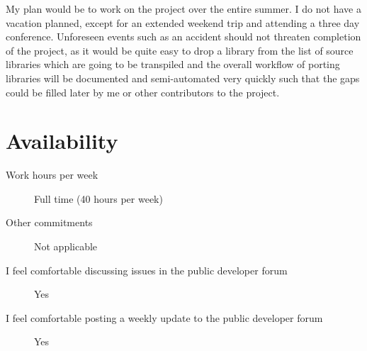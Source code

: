 \documentclass{scrartcl}
\begin{document}
My plan would be to work on the project over the entire summer. I do not have a vacation planned, except for an extended weekend trip and attending a three day conference. Unforeseen events such as an accident should not threaten completion of the project, as it would be quite easy to drop a library from the list of source libraries which are going to be transpiled and the overall workflow of porting libraries will be documented and semi-automated very quickly such that the gaps could be filled later by me or other contributors to the project.

\section{Availability}

\begin{description}
\item [Work hours per week] Full time (40 hours per week)
\item [Other commitments] Not applicable
\item [I feel comfortable discussing issues in the public developer forum] Yes
\item [I feel comfortable posting a weekly update to the public developer forum] Yes
\end{description}

\clearpage


\end{document}
